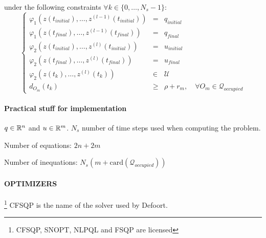 under the following constraints $\forall k \in \{0,\dotsc,N_s -1\}$:
\begin{equation}%
\left\lbrace\begin{array}{lcl}
	\varphi_1(z(t_{initial}),\dotsc,z^{(l-1)}(t_{initial})) & = & q_{initial}\\
    \varphi_1(z(t_{final}),\dotsc,z^{(l-1)}(t_{final})) & = & q_{final}\\
    \varphi_2(z(t_{initial}),\dotsc,z^{(l)}(t_{initial})) & = & u_{initial}\\
    \varphi_2(z(t_{final}),\dotsc,z^{(l)}(t_{final}))& = & u_{final}\\
    \varphi_2(z(t_k),\dotsc,z^{(l)}(t_k)) &\in& \mathcal{U}\\
    d_{O_m}(t_k) &\geq& \rho + r_m,\quad \forall O_m \in \mathcal{Q}_{occupied}
\end{array}\right.
\end{equation}

\paragraph{Practical stuff for implementation}

$q \in \mathbb{R}^n$ and $u \in \mathbb{R}^m$. $N_s$ number of time steps used when computing the problem.

Number of equations: $2n + 2m$

Number of inequations: $N_s(m+\mathrm{card}(\mathcal{Q}_{occupied}))$

\paragraph{OPTIMIZERS}\footnote{CFSQP, SNOPT, NLPQL and FSQP are licensed} CFSQP is the name of the solver used by Defoort.





